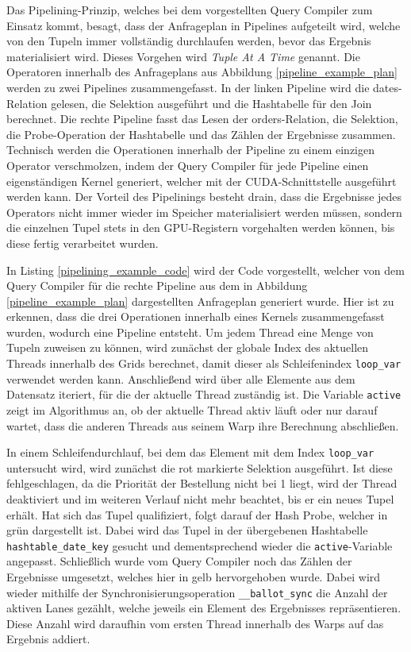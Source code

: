 Das Pipelining-Prinzip, welches bei dem vorgestellten Query Compiler zum Einsatz kommt, besagt, dass der Anfrageplan in Pipelines aufgeteilt wird, welche von den Tupeln immer vollständig durchlaufen werden, bevor das Ergebnis materialisiert wird.
Dieses Vorgehen wird \emph{Tuple At A Time} genannt.
Die Operatoren innerhalb des Anfrageplans aus Abbildung \ref{pipeline_example_plan} werden zu zwei Pipelines zusammengefasst.
In der linken Pipeline wird die \textsf{dates}-Relation gelesen, die Selektion ausgeführt und die Hashtabelle für den Join berechnet.
Die rechte Pipeline fasst das Lesen der \textsf{orders}-Relation, die Selektion, die Probe-Operation der Hashtabelle und das Zählen der Ergebnisse zusammen.
Technisch werden die Operationen innerhalb der Pipeline zu einem einzigen Operator verschmolzen, indem der Query Compiler für jede Pipeline einen eigenständigen Kernel generiert, welcher mit der CUDA-Schnittstelle ausgeführt werden kann.
Der Vorteil des Pipelinings besteht drain, dass die Ergebnisse jedes Operators nicht immer wieder im Speicher materialisiert werden müssen, sondern die einzelnen Tupel stets in den GPU-Registern vorgehalten werden können, bis diese fertig verarbeitet wurden.

In Listing \ref{pipelining_example_code} wird der Code vorgestellt, welcher von dem Query Compiler für die rechte Pipeline aus dem in Abbildung \ref{pipeline_example_plan} dargestellten Anfrageplan generiert wurde.
Hier ist zu erkennen, dass die drei Operationen innerhalb eines Kernels zusammengefasst wurden, wodurch eine Pipeline entsteht.
Um jedem Thread eine Menge von Tupeln zuweisen zu können, wird zunächst der globale Index des aktuellen Threads innerhalb des Grids berechnet, damit dieser als Schleifenindex \texttt{loop\_var} verwendet werden kann.
Anschließend wird über alle Elemente aus dem Datensatz iteriert, für die der aktuelle Thread zuständig ist.
Die Variable \texttt{active} zeigt im Algorithmus an, ob der aktuelle Thread aktiv läuft oder nur darauf wartet, dass die anderen Threads aus seinem Warp ihre Berechnung abschließen.

In einem Schleifendurchlauf, bei dem das Element mit dem Index \texttt{loop\_var} untersucht wird, wird zunächst die rot markierte Selektion ausgeführt.
Ist diese fehlgeschlagen, da die Priorität der Bestellung nicht bei 1 liegt, wird der Thread deaktiviert und im weiteren Verlauf nicht mehr beachtet, bis er ein neues Tupel erhält.
Hat sich das Tupel qualifiziert, folgt darauf der Hash Probe, welcher in grün dargestellt ist.
Dabei wird das Tupel in der übergebenen Hashtabelle \texttt{hashtable\_date\_key} gesucht und dementsprechend wieder die \texttt{active}-Variable angepasst.
Schließlich wurde vom Query Compiler noch das Zählen der Ergebnisse umgesetzt, welches hier in gelb hervorgehoben wurde.
Dabei wird wieder mithilfe der Synchronisierungsoperation \texttt{\_\_ballot\_sync} die Anzahl der aktiven Lanes gezählt, welche jeweils ein Element des Ergebnisses repräsentieren.
Diese Anzahl wird daraufhin vom ersten Thread innerhalb des Warps auf das Ergebnis addiert. 

